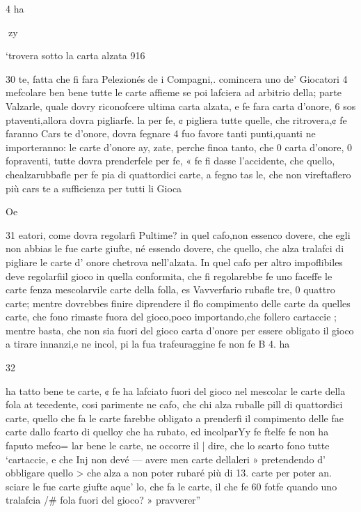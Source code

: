 \documentclass[11pt,a6paper]{article}
\begin{document}
4 ha

 

 
zy

‘trovera sotto la carta alzata 916

30
te, fatta che fi fara Pelezionés
de i Compagni,. comincera uno
de’ Giocatori 4 mefcolare ben
bene tutte le carte affieme se
poi lafciera ad arbitrio della;
parte Valzarle, quale dovry
riconofcere ultima carta alzata, e fe fara carta d’onore, 6 sos
ptaventi,allora dovra pigliarfe.
la per fe, ¢ pigliera tutte quelle,
che ritrovera,¢ fe faranno Cars
te d’onore, dovra fegnare 4 fuo
favore tanti punti,quanti ne importeranno: le carte d’onore ay,
zate, perche finoa tanto, che
0
carta d’onore, 0 fopraventi, tutte dovra prenderfele per fe, «
fe fi dasse l’accidente, che quello, chealzarubbafle per fe pia
di quattordici carte, a fegno tas
le, che non vireftaflero più cars
te a sufficienza per tutti li Gioca 

Oe

31
eatori, come dovra regolarfi
Pultime? in quel cafo,non essenco dovere, che egli non abbias
le fue carte giufte, né essendo
dovere, che quello, che alza
tralafci di pigliare le carte d’
onore chetrova nell’alzata. In
quel cafo per altro impoflibiles
deve regolarfiil gioco in quella
conformita, che fi regolarebbe
fe uno faceffe le carte fenza mescolarvile carte della folla, es
Vavverfario rubafle tre, 0 quattro carte; mentre dovrebbes
finire diprendere il flo compimento delle carte da quelles
carte, che fono rimaste fuora
del gioco,poco importando,che
follero cartaccie ; mentre basta,
che non sia fuori del gioco carta d’onore per essere obligato il
gioco a tirare innanzi,e ne incol, pi la fua trafeuraggine fe non
fe B 4. ha
 

 

 

 

 

32

ha tatto bene te carte, ¢ fe ha
lafciato fuori del gioco nel mescolar le carte della fola at
tecedente, cosi parimente ne
cafo, che chi alza ruballe pill di
quattordici carte, quello che fa
le carte farebbe obligato a
prenderfi il compimento delle
fae carte dallo fcarto di quelloy che ha rubato, ed incolparYy
fe ftelfe fe non ha faputo mefco=
lar bene le carte, ne occorre il |
dire, che lo scarto fono tutte
‘cartaccie, e che Inj non devé —
avere men carte dellaleri » pretendendo d’ obbligare quello >
che alza a non poter rubaré
più di 13. carte per poter an.
sciare le fue carte giufte aque’
lo, che fa le carte, il che fe 60%
fotfe quando uno tralafcia /#
fola fuori del gioco? » pravverer”
\end{document}
